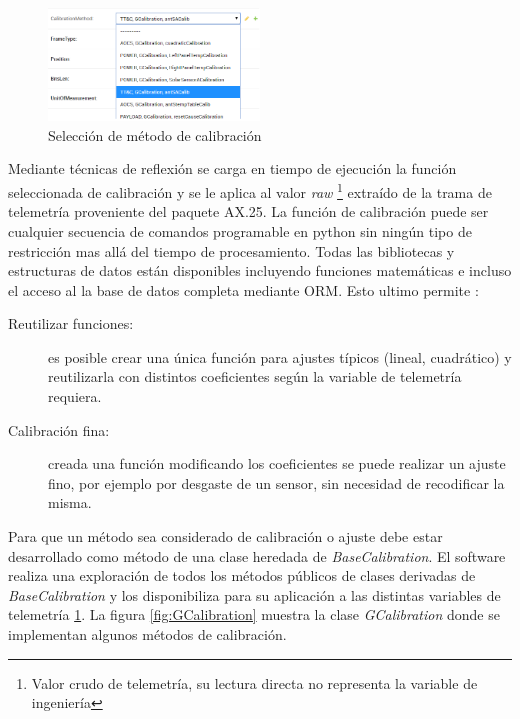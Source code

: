 \documentclass[twoside,twocolumn]{article}
\begin{document}
\begin{figure}[]
  \caption{Selección de método de calibración}
  \label{fig:MetodoCalibracion}
  \centering
  \includegraphics[width=0.5\textwidth]{Imagenes/TTCCalibracionDiscreta.png}
\end{figure}

Mediante técnicas de reflexión se carga en tiempo de ejecución la función seleccionada de calibración y se le aplica al valor \textit{raw} \footnote{Valor crudo de telemetría, su lectura directa no representa la variable de ingeniería} extraído de la trama de telemetría proveniente del paquete AX.25. La función de calibración puede ser cualquier secuencia de comandos programable en python sin ningún tipo de restricción mas allá del tiempo de procesamiento. Todas las bibliotecas y estructuras de datos están disponibles incluyendo funciones matemáticas e incluso el acceso al la base de datos completa mediante ORM. Esto ultimo permite :

\begin{description}
 \item [Reutilizar funciones: ] es posible crear una única función para ajustes típicos (lineal, cuadrático) y reutilizarla con distintos coeficientes según la variable de telemetría requiera.
 \item [Calibración fina: ] creada una función modificando los coeficientes se puede realizar un ajuste fino, por ejemplo por desgaste de un sensor, sin necesidad de recodificar la misma.
\end{description}

Para que un método sea considerado de calibración o ajuste debe estar desarrollado como método de una clase heredada de \textit{BaseCalibration}. El software realiza una exploración de todos los métodos públicos de clases derivadas de \textit{BaseCalibration} y los disponibiliza para su aplicación a las distintas variables de telemetría \ref{fig:MetodoCalibracion}. La figura \ref{fig:GCalibration} muestra la clase \textit{GCalibration} donde se implementan algunos métodos de calibración.
\end{document}
